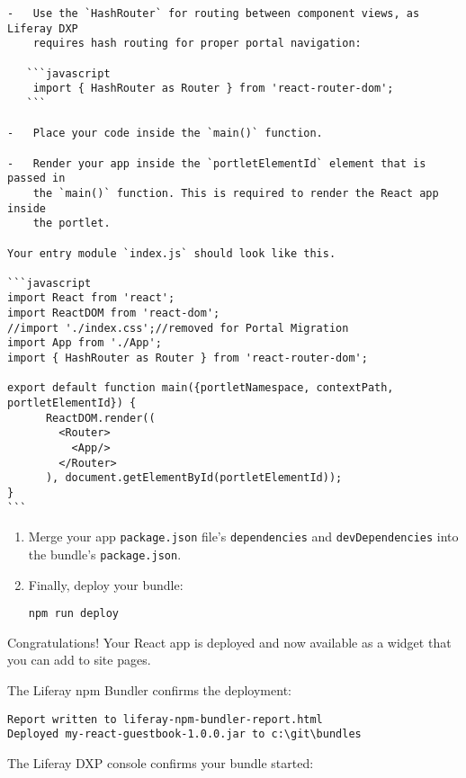 \noindent\hrulefill

\begin{verbatim}
-   Use the `HashRouter` for routing between component views, as Liferay DXP 
    requires hash routing for proper portal navigation:

   ```javascript
    import { HashRouter as Router } from 'react-router-dom';
   ```

-   Place your code inside the `main()` function.

-   Render your app inside the `portletElementId` element that is passed in 
    the `main()` function. This is required to render the React app inside
    the portlet.

Your entry module `index.js` should look like this. 

```javascript
import React from 'react';
import ReactDOM from 'react-dom';
//import './index.css';//removed for Portal Migration
import App from './App';
import { HashRouter as Router } from 'react-router-dom';

export default function main({portletNamespace, contextPath, 
portletElementId}) {
      ReactDOM.render((
        <Router>
          <App/>
        </Router>
      ), document.getElementById(portletElementId));
}
```
\end{verbatim}

\begin{enumerate}
\def\labelenumi{\arabic{enumi}.}
\setcounter{enumi}{6}
\item
  Merge your app \texttt{package.json} file's \texttt{dependencies} and
  \texttt{devDependencies} into the bundle's \texttt{package.json}.
\item
  Finally, deploy your bundle:

\begin{verbatim}
npm run deploy
\end{verbatim}
\end{enumerate}

Congratulations! Your React app is deployed and now available as a
widget that you can add to site pages.

The Liferay npm Bundler confirms the deployment:

\begin{verbatim}
Report written to liferay-npm-bundler-report.html
Deployed my-react-guestbook-1.0.0.jar to c:\git\bundles
\end{verbatim}

The Liferay DXP console confirms your bundle started:

